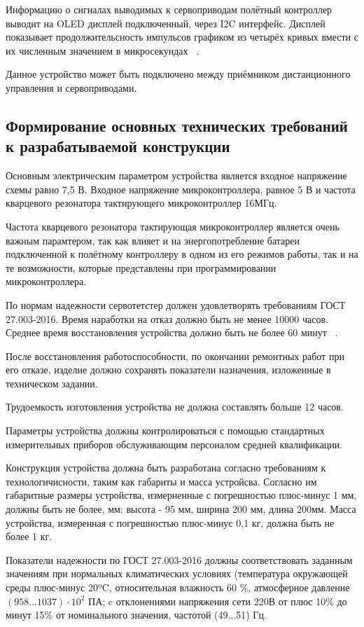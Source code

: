 Информацию о сигналах выводимых к сервоприводам полётный контроллер
выводит на OLED дисплей подключенный, через I2C интерфейс.  Дисплей
показывает продолжительсность импульсов графиком из четырёх кривых
вмести с их численным значением в микросекундах
~\cite{Elector521}.

Данное устройство может быть подключено между приёмником
дистанционного управления и сервоприводами.

\subsection{Формирование основных технических требований
  к разрабатываемой конструкции}

Основным электрическим параметром устройства является входное
напряжение схемы равно 7,5 В. Входное напряжение микроконтроллера,
равное 5 В и частота  кварцевого резонатора
тактирующего микроконтроллер 16МГц.

Частота кварцевого резонатора тактирующая микроконтроллер является
очень важным парамтером, так как влияет и на энергопотребление батареи
подключенной к полётному контроллеру в одном из его режимов работы,
так и на те возможности, которые представлены при программировании
микроконтроллера.

По нормам надежности сервотетстер должен удовлетворять требованиям
ГОСТ 27.003-2016. Время наработки на отказ должно быть не менее 10000
часов. Среднее время восстановления устройства должно быть не более 60
минут ~\cite{GOST-27.003-2016}.

После восстановления работоспособности, по окончании ремонтных работ
при его отказе, изделие должно сохранять показатели назначения,
изложенные в техническом задании.

Трудоемкость изготовления устройства не должна
составлять больше 12 часов.

Параметры устройства должны контролироваться с помощью стандартных
измерительных приборов обслуживающим персоналом средней квалификации.

Конструкция устройства должна быть разработана согласно требованиям к
технологичисности, таким как габариты и масса устройсва.  Согласно им
габаритные размеры устройства, измерненные с погрешностью плюс-минус 1
мм, должны быть не более, мм: высота - 95 мм, ширина 200 мм, длина
200мм. Масса устройства, измеренная с погрешностью плюс-минус 0,1 кг,
должна быть не более 1 кг.

Показатели надежности по ГОСТ 27.003-2016 должны соответствовать
заданным значениям при нормальных климатических условиях (температура
окружающей среды плюс-минус 20ºC, относительная влажность 60 \%,
атмосферное давление $(958...1037) \cdot 10^2$ ПА; c отклонениями
напряжения сети 220В от плюс 10\% до минут 15\% от номинального
значения, частотой (49...51) Гц.

